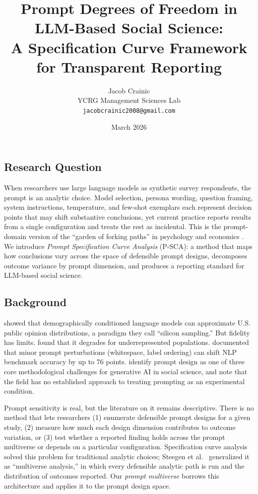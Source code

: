 \documentclass{article}
\title{Prompt Degrees of Freedom in LLM-Based Social Science:\\ A Specification Curve Framework for Transparent Reporting}
\author{
  Jacob Crainic \\
  YCRG Management Sciences Lab \\
  \texttt{jacobcrainic2008@gmail.com}
}
\date{March 2026}
\begin{document}
\maketitle

\subsection*{Research Question}

When researchers use large language models as synthetic survey respondents, the prompt is an analytic choice.
Model selection, persona wording, question framing, system instructions, temperature, and few-shot exemplars each represent decision points that may shift substantive conclusions, yet current practice reports results from a single configuration and treats the rest as incidental.
This is the prompt-domain version of the ``garden of forking paths'' in psychology and economics \citep{gelman2014statistical, simonsohn2020specification}.
We introduce \textit{Prompt Specification Curve Analysis} (P-SCA): a method that maps how conclusions vary across the space of defensible prompt designs, decomposes outcome variance by prompt dimension, and produces a reporting standard for LLM-based social science.

\subsection*{Background}

\citet{argyle2023out} showed that demographically conditioned language models can approximate U.S. public opinion distributions, a paradigm they call ``silicon sampling.''
But fidelity has limits.
\citet{bisbee2024synthetic} found that it degrades for underrepresented populations.
\citet{sclar2024quantifying} documented that minor prompt perturbations (whitespace, label ordering) can shift NLP benchmark accuracy by up to 76 points.
\citet{karell2025integrating} identify prompt design as one of three core methodological challenges for generative AI in social science, and note that the field has no established approach to treating prompting as an experimental condition.

Prompt sensitivity is real, but the literature on it remains descriptive.
There is no method that lets researchers (1) enumerate defensible prompt designs for a given study, (2) measure how much each design dimension contributes to outcome variation, or (3) test whether a reported finding holds across the prompt multiverse or depends on a particular configuration.
Specification curve analysis \citep{simonsohn2020specification} solved this problem for traditional analytic choices; Steegen et al.\ \citep{steegen2016increasing} generalized it as ``multiverse analysis,'' in which every defensible analytic path is run and the distribution of outcomes reported.
Our \textit{prompt multiverse} borrows this architecture and applies it to the prompt design space.
\end{document}
